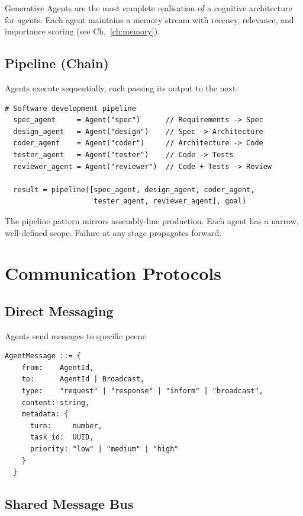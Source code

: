 Generative Agents are the most complete realisation of a cognitive architecture for \llm agents. Each agent maintains a memory stream with recency, relevance, and importance scoring (see Ch.~\ref{ch:memory}).

\subsection{Pipeline (Chain)}

Agents execute sequentially, each passing its output to the next:

\begin{lstlisting}[caption=Pipeline pattern]
  # Software development pipeline
  spec_agent     = Agent("spec")      // Requirements -> Spec
  design_agent   = Agent("design")    // Spec -> Architecture
  coder_agent    = Agent("coder")     // Architecture -> Code
  tester_agent   = Agent("tester")    // Code -> Tests
  reviewer_agent = Agent("reviewer")  // Code + Tests -> Review

  result = pipeline([spec_agent, design_agent, coder_agent,
                     tester_agent, reviewer_agent], goal)
\end{lstlisting}

The pipeline pattern mirrors assembly-line production. Each agent has a narrow, well-defined scope. Failure at any stage propagates forward.

\section{Communication Protocols}

\subsection{Direct Messaging}

Agents send messages to specific peers:

\begin{lstlisting}[caption=Agent message format]
  AgentMessage ::= {
    from:    AgentId,
    to:      AgentId | Broadcast,
    type:    "request" | "response" | "inform" | "broadcast",
    content: string,
    metadata: {
      turn:     number,
      task_id:  UUID,
      priority: "low" | "medium" | "high"
    }
  }
\end{lstlisting}

\subsection{Shared Message Bus}


